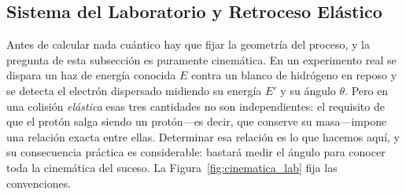 \documentclass[10pt,a4paper]{article}
\begin{document}
\subsection{Sistema del Laboratorio y Retroceso Elástico}
Antes de calcular nada cuántico hay que fijar la geometría del proceso, y la pregunta de esta subsección es puramente cinemática. En un experimento real se dispara un haz de energía conocida $E$ contra un blanco de hidrógeno en reposo y se detecta el electrón dispersado midiendo su energía $E'$ y su ángulo $\theta$. Pero en una colisión \emph{elástica} esas tres cantidades no son independientes: el requisito de que el protón salga siendo un protón---es decir, que conserve su masa---impone una relación exacta entre ellas. Determinar esa relación es lo que hacemos aquí, y su consecuencia práctica es considerable: bastará medir el ángulo para conocer toda la cinemática del suceso. La Figura~\ref{fig:cinematica_lab} fija las convenciones.
\end{document}
